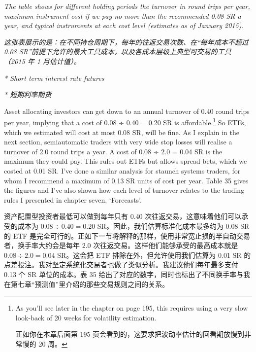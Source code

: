 \smallskip \smallskip \noindent\textit{The table shows for different holding periods the turnover in round trips per year, maximum instrument cost if we pay no more than the recommended 0.08 SR a year, and typical instruments at each cost level (estimates as of January 2015).}

\smallskip \noindent\textit{这张表展示的是：在不同持仓周期下，每年的往返交易次数、在“每年成本不超过 0.08 SR”前提下允许的最大工具成本，以及各成本层级上典型可交易的工具（2015 年 1 月估计值）。}

\smallskip \noindent\textit{* Short term interest rate futures}

\smallskip \noindent\textit{* 短期利率期货}

\begin{englishblock} Asset allocating investors can get down to an annual turnover of 0.40 round trips per year, implying that a cost of 0.08 ÷ 0.40 = 0.20 SR is affordable.\footnote{As you'll see later in the chapter on page 195, this requires using a very slow look-back of 20 weeks for volatility estimation. \par 正如你在本章后面第 195 页会看到的，这要求把波动率估计的回看期放慢到非常慢的 20 周。} So ETFs, which we estimated will cost at most 0.08 SR, will be fine. As I explain in the next section, semiautomatic traders with very wide stop losses will realise a turnover of 2.0 round trips a year. A cost of 0.08 ÷ 2.0 = 0.04 SR is the maximum they could pay. This rules out ETFs but allows spread bets, which we costed at 0.01 SR. I've done a similar analysis for staunch systems traders, for whom I recommend a maximum of 0.13 SR units of cost per year. Table 35 gives the figures and I've also shown how each level of turnover relates to the trading rules I presented in chapter seven, ‘Forecasts'. \end{englishblock}

\begin{chineseblock}资产配置型投资者最低可以做到每年只有 0.40 次往返交易，这意味着他们可以承受的成本为 \(0.08 \div 0.40 = 0.20\) SR。因此，我们估算标准化成本最多约为 0.08 SR 的 ETF 是完全可行的。正如下一节将解释的那样，使用非常宽止损的半自动交易者，换手率大约会是每年 2.0 次往返交易。这样他们能够承受的最高成本就是 \(0.08 \div 2.0 = 0.04\) SR。这会把 ETF 排除在外，但允许使用我们估算为 0.01 SR 的点差投注。我对坚定系统化交易者也做了类似分析。我建议他们每年最多支付 0.13 个 SR 单位的成本。表 35 给出了对应的数字，同时也标出了不同换手率与我在第七章“预测值”里介绍的那些交易规则之间的关系。\end{chineseblock}

